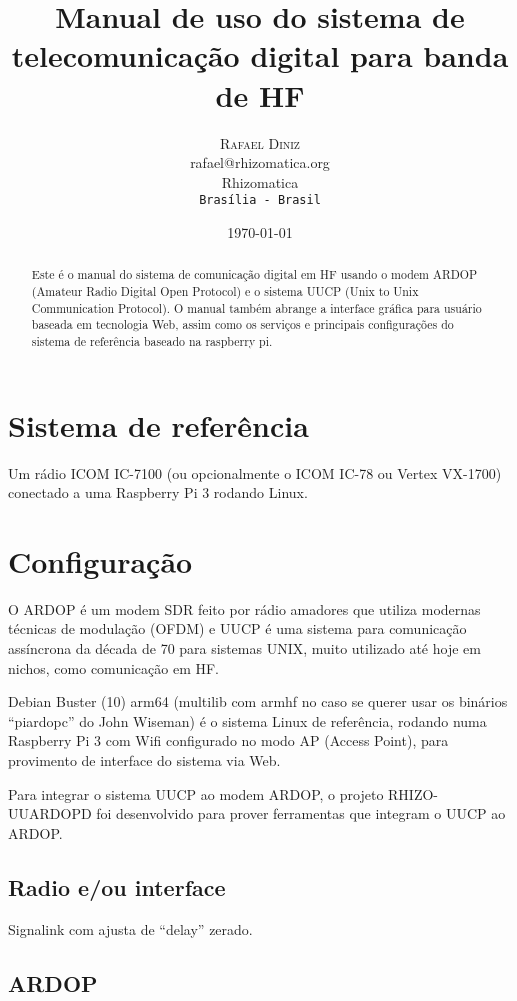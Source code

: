 \documentclass[11pt,a4paper]{article}
\title{Manual de uso do sistema de telecomunicação digital para banda de HF}
\author{
       \large
        \textsc{Rafael Diniz}
        \mbox{}\\ %
        rafael@rhizomatica.org\\
        \mbox{Rhizomatica} \\ %
        \normalsize
        \texttt{Brasília - Brasil}\\
}
\date{\today}
\begin{document}
\maketitle

\begin{abstract}
Este é o manual do sistema de comunicação digital em HF usando o modem ARDOP
(Amateur Radio Digital Open Protocol) e o sistema UUCP (Unix to Unix
Communication Protocol). O manual também abrange a interface gráfica
para usuário baseada em tecnologia Web, assim como os serviços e principais
configurações do sistema de referência baseado na raspberry pi.

\end{abstract}

\newpage

\tableofcontents

\section{Sistema de referência}

Um rádio ICOM IC-7100 (ou opcionalmente o ICOM IC-78 ou Vertex VX-1700)
conectado a uma Raspberry Pi 3 rodando Linux.

\section{Configuração}

O ARDOP é um modem SDR feito por rádio amadores que utiliza modernas
técnicas de modulação (OFDM) e UUCP é uma sistema para comunicação
assíncrona da década de 70 para sistemas UNIX, muito utilizado até
hoje em nichos, como comunicação em HF.

Debian Buster (10) arm64 (multilib com armhf no caso se querer usar os
binários ``piardopc'' do John Wiseman) é o sistema Linux de referência,
rodando numa Raspberry Pi 3 com Wifi configurado no modo AP (Access Point),
para provimento de interface do sistema via Web.

Para integrar o sistema UUCP ao modem ARDOP, o projeto RHIZO-UUARDOPD
foi desenvolvido para prover ferramentas que integram o UUCP ao ARDOP.

\subsection{Radio e/ou interface}

Signalink com ajusta de ``delay'' zerado.


\subsection{ARDOP}
\end{document}
